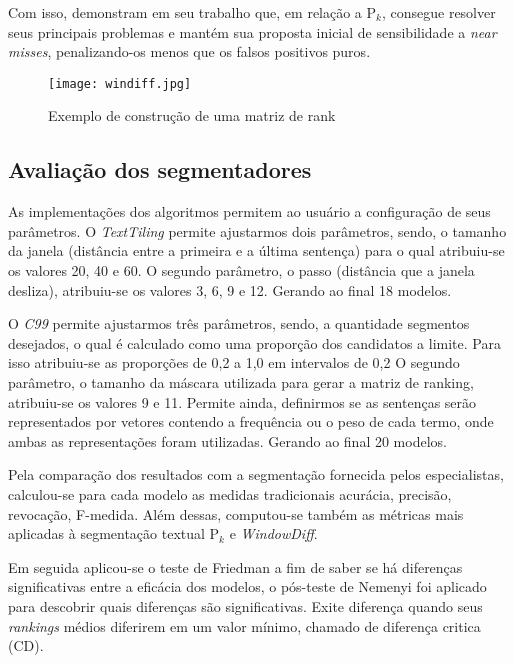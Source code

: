 Com isso, demonstram em seu trabalho que, em relação a P$_k$, consegue resolver seus principais problemas e mantém sua proposta inicial de sensibilidade a \textit{near misses}, penalizando-os menos que os falsos positivos puros.


  \begin{figure}[!h]

	\centering
	\texttt{[image: windiff.jpg]}
	\caption{Exemplo de construção de uma matriz de rank}
	\label{fig:exemplosegmentacao}

  \end{figure}
  
  



\subsection{Avaliação dos segmentadores}


As implementações dos algoritmos permitem ao usuário a configuração de seus parâmetros. 
%
O \textit{TextTiling} permite ajustarmos dois parâmetros, sendo, o tamanho da janela (distância entre a primeira e a última sentença) para o qual atribuiu-se os valores 20, 40 e 60. O segundo parâmetro, o passo (distância que a janela desliza), atribuiu-se os valores 3, 6, 9 e 12. Gerando ao final 18 modelos.
%

O \textit{C99} permite ajustarmos três parâmetros, sendo, a quantidade segmentos desejados, o qual é calculado como uma proporção dos candidatos a limite. Para isso atribuiu-se as proporções de 0,2 a 1,0 em intervalos de 0,2 O segundo parâmetro, o tamanho da máscara utilizada para gerar a matriz de ranking, atribuiu-se os valores 9 e 11. Permite ainda, definirmos se as sentenças serão representados por vetores contendo a frequência ou o peso de cada termo, onde ambas as representações foram utilizadas. Gerando ao final 20 modelos.



Pela comparação dos resultados com a segmentação fornecida pelos especialistas, calculou-se para cada modelo as medidas tradicionais acurácia, precisão, revocação, F-medida. Além dessas, computou-se também as métricas mais aplicadas à segmentação textual P$_k$ e \textit{WindowDiff}.



Em seguida aplicou-se o teste de Friedman a fim de saber se há diferenças significativas entre a eficácia dos modelos, o pós-teste de Nemenyi foi aplicado para descobrir quais diferenças são significativas. 
%
Exite diferença quando seus \textit{rankings} médios diferirem em um valor mínimo, chamado de diferença critica (CD). 
%

